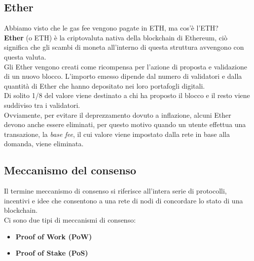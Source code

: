 \subsection{Ether}
Abbiamo visto che le gas fee vengono pagate in ETH, ma cos'è l'ETH? \\
\textbf{Ether} (o ETH) è la criptovaluta nativa della blockchain di Ethereum, ciò
significa che gli scambi di moneta all'interno di questa struttura avvengono
con questa valuta. \\
Gli Ether vengono creati come ricompensa per l'azione di proposta e validazione
di un nuovo blocco. L'importo emesso dipende dal numero di validatori e dalla
quantità di Ether che hanno depositato nei loro portafogli digitali. \\
Di solito 1/8 del valore viene destinato a chi ha proposto il blocco e il resto
viene suddiviso tra i validatori. \\
Ovviamente, per evitare il deprezzamento dovuto a inflazione, alcuni Ether 
devono anche essere eliminati, per questo motivo quando un utente effettua
una transazione, la \textit{base fee}, il cui valore viene impostato dalla
rete in base alla domanda, viene eliminata.

\newpage

\subsection{Meccanismo del consenso}
Il termine meccanismo di consenso si riferisce all'intera serie di protocolli,
incentivi e idee che consentono a una rete di nodi di concordare lo stato di
una blockchain. \\
Ci sono due tipi di meccanismi di consenso: 
\begin{itemize}
    \item \textbf{Proof of Work (PoW)}
    \item \textbf{Proof of Stake (PoS)}
\end{itemize}

